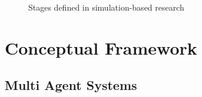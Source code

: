 \documentclass[11pt,oneside,a4paper,openright]{report}
\begin{document}
\begin{figure}[h]
\centering
\setlength\fboxsep{0pt}
\setlength\fboxrule{0.5pt}
\caption{Stages defined in simulation-based research \cite{RussellNorvig}}
\label{fig:SimTL}
\end{figure}







\section{Conceptual Framework}

\subsection{Multi Agent Systems} %


\end{document}
